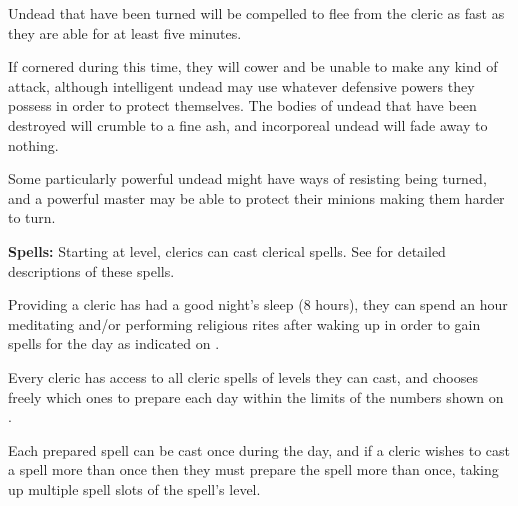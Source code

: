 \begin{multicols*}{2}
Undead that have been turned will be compelled to flee from the cleric as fast as they are able for at least five minutes.

If cornered during this time, they will cower and be unable to make any kind of attack, although intelligent undead may use whatever defensive powers they possess in order to protect themselves. The bodies of undead that have been destroyed will crumble to a fine ash, and incorporeal undead will fade away to nothing.

Some particularly powerful undead might have ways of resisting being turned, and a powerful master may be able to protect their minions making them harder to turn.


\textbf{Spells:} Starting at  level, clerics can cast clerical spells. See  for detailed descriptions of these spells.

Providing a cleric has had a good night’s sleep (8 hours), they can spend an hour meditating and/or performing religious rites after waking up in order to gain spells for the day as indicated on .

Every cleric has access to all cleric spells of levels they can cast, and chooses freely which ones to prepare each day within the limits of the numbers shown on .

Each prepared spell can be cast once during the day, and if a cleric wishes to cast a spell more than once then they must prepare the spell more than once, taking up multiple spell slots of the spell’s level.


\end{multicols*}
